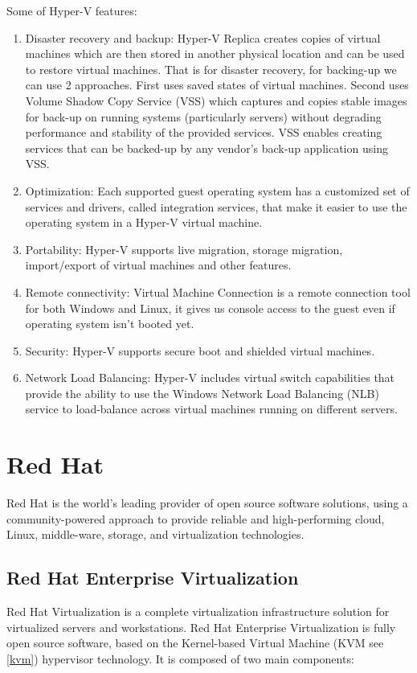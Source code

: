 Some of Hyper-V features:
\begin{enumerate}
\item Disaster recovery and backup: Hyper-V Replica creates copies of virtual machines which are then stored in another physical location and can be used to restore virtual machines. That is for disaster recovery, for backing-up we can use 2 approaches. First uses saved states of virtual machines. Second uses Volume Shadow Copy Service (VSS) which captures and copies stable images for back-up on running systems (particularly servers) without degrading performance and stability of the provided services. VSS enables creating services that can be backed-up by any vendor's back-up application using VSS.
\item Optimization: Each supported guest operating system has a customized set of services and drivers, called integration services, that make it easier to use the operating system in a Hyper-V virtual machine.
\item Portability: Hyper-V supports live migration, storage migration, import/export of virtual machines and other features.
\item Remote connectivity: Virtual Machine Connection is a remote connection tool for both Windows and Linux, it gives us console access to the guest even if operating system isn't booted yet.
\item Security: Hyper-V supports secure boot and shielded virtual machines.
\item Network Load Balancing: Hyper-V includes virtual switch capabilities that provide the ability to use the Windows Network Load Balancing (NLB) service to load-balance across virtual machines running on different servers.
\end{enumerate}

\section{Red Hat \cite{redhat}}
Red Hat is the world's leading provider of open source software solutions, using a community-powered approach to provide reliable and high-performing cloud, Linux, middle-ware, storage, and virtualization technologies.

\subsection{Red Hat Enterprise Virtualization \cite{rhev}} 
\label{rhev}
Red Hat Virtualization is a complete virtualization infrastructure solution for virtualized servers and workstations. Red Hat Enterprise Virtualization is fully open source software, based on the Kernel-based Virtual Machine (KVM see \ref{kvm}) hypervisor technology. It is  composed of two main components:


